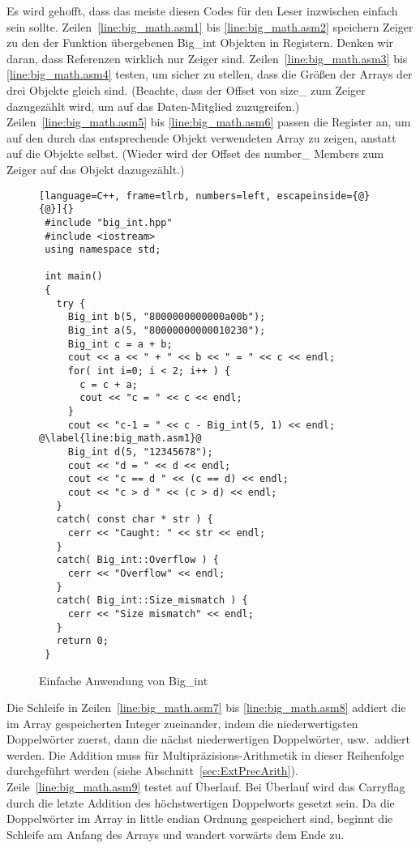 Es wird gehofft, dass das meiste diesen Codes f\"{u}r den Leser
inzwischen einfach sein sollte. Zeilen~\ref{line:big_math.asm1} bis
\ref{line:big_math.asm2} speichern Zeiger zu den der Funktion
\"{u}bergebenen {\code Big\_int} Objekten in Registern. Denken wir
daran, dass Referenzen wirklich nur Zeiger sind.
Zeilen~\ref{line:big_math.asm3} bis \ref{line:big_math.asm4} testen,
um sicher zu stellen, dass die Gr\"{o}{\ss}en der Arrays der drei Objekte
gleich sind. (Beachte, dass der Offset von {\code size\_} zum Zeiger
dazugez\"{a}hlt wird, um auf das Daten-Mitglied zuzugreifen.)
Zeilen~\ref{line:big_math.asm5} bis \ref{line:big_math.asm6} passen
die Register an, um auf den durch das entsprechende Objekt
verwendeten Array zu zeigen, anstatt auf die Objekte selbst. (Wieder
wird der Offset des {\code number\_} Members zum Zeiger auf das
Objekt dazugez\"{a}hlt.)

\begin{figure}[tp]
\begin{lstlisting}[language=C++, frame=tlrb, numbers=left, escapeinside={@}{@}]{}
 #include "big_int.hpp"
 #include <iostream>
 using namespace std;

 int main()
 {
   try {
     Big_int b(5, "8000000000000a00b");
     Big_int a(5, "80000000000010230");
     Big_int c = a + b;
     cout << a << " + " << b << " = " << c << endl;
     for( int i=0; i < 2; i++ ) {
       c = c + a;
       cout << "c = " << c << endl;
     }
     cout << "c-1 = " << c - Big_int(5, 1) << endl;      @\label{line:big_math.asm1}@
     Big_int d(5, "12345678");
     cout << "d = " << d << endl;
     cout << "c == d " << (c == d) << endl;
     cout << "c > d " << (c > d) << endl;
   }
   catch( const char * str ) {
     cerr << "Caught: " << str << endl;
   }
   catch( Big_int::Overflow ) {
     cerr << "Overflow" << endl;
   }
   catch( Big_int::Size_mismatch ) {
     cerr << "Size mismatch" << endl;
   }
   return 0;
 }
\end{lstlisting}
\caption{ Einfache Anwendung von {\code Big\_int} \label{fig:BigIntEx}}
\end{figure}

Die Schleife in Zeilen~\ref{line:big_math.asm7} bis
\ref{line:big_math.asm8} addiert die im Array gespeicherten Integer
zueinander, indem die niederwertigsten Doppelw\"{o}rter zuerst, dann die
n\"{a}chst niederwertigen Doppelw\"{o}rter, usw.\ addiert werden. Die
Addition muss f\"{u}r Multipr\"{a}zisions-Arithmetik in dieser Reihenfolge
durchgef\"{u}hrt werden (siehe Abschnitt~\ref{sec:ExtPrecArith}).
Zeile~\ref{line:big_math.asm9} testet auf \"{U}berlauf. Bei \"{U}berlauf
wird das Carryflag durch die letzte Addition des h\"{o}chstwertigen
Doppelworts gesetzt sein. Da die Doppelw\"{o}rter im Array in little
endian Ordnung gespeichert sind, beginnt die Schleife am Anfang des
Arrays und wandert vorw\"{a}rts dem Ende zu.

